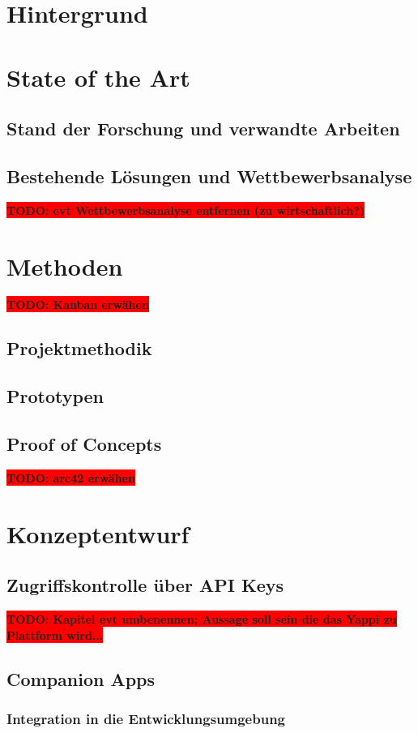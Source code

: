 \documentclass[12pt,a4paper]{report}
\newcommand{\todo}[1]{\colorbox{red}{\textbf{TODO: #1}}\\}
\begin{document}
\chapter{Hintergrund}
\chapter{State of the Art}
\section{Stand der Forschung und verwandte Arbeiten}
\section{Bestehende Lösungen und Wettbewerbsanalyse}

\todo{evt Wettbewerbsanalyse entfernen (zu wirtschaftlich?)}

\chapter{Methoden}
\todo{Kanban erwähen}
\section{Projektmethodik}
\section{Prototypen}
\section{Proof of Concepts}

\todo{arc42 erwähen}

\chapter{Konzeptentwurf}
\section{Zugriffskontrolle über API Keys}

\todo{Kapitel evt umbenennen; Aussage soll sein die das Yappi zu Plattform wird...}

\section{Companion Apps}
\subsection{Integration in die Entwicklungsumgebung}
\end{document}
